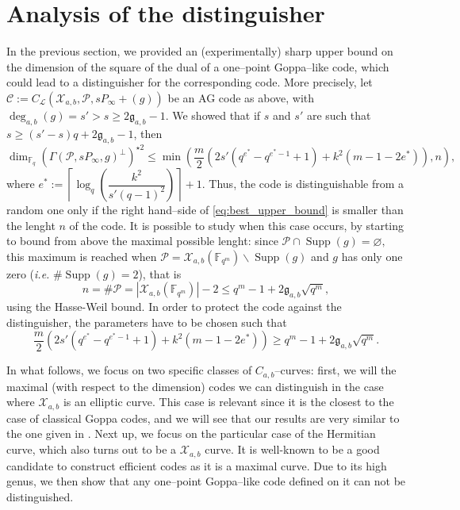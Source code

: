 \documentclass[a4paper]{amsart}
\theoremstyle{definition}
\theoremstyle{remark}
\newcommand{\calP}{\mathcal{P}}
\newcommand{\calL}{\mathcal{L}}
\newcommand{\calC}{\mathcal{C}}
\newcommand{\calX}{\mathcal{X}}
\newcommand{\fqm}{\mathbb{F}_{q^m}}
\newcommand{\fq}{\mathbb{F}_{q}}
\newcommand{\Supp}{\operatorname{Supp}}
\newcommand{\degab}[1]{\deg_{a,b}\left(#1\right)}
\begin{document}
\section{Analysis of the distinguisher}\label{sec:analysis}

In the previous section, we provided an (experimentally) sharp upper bound on the dimension of the square of the dual of a one--point Goppa--like code, which could lead to a distinguisher for the corresponding code. More precisely, let $\calC := C_\calL(\calX_{a,b},\calP,sP_\infty +(g))$ be an AG code as above, with $\degab{g} = s'>s\geq 2\mathfrak{g}_{a,b}-1$. We showed that if $s$ and $s'$ are such that $s \geq (s'-s)q+2\mathfrak{g}_{a,b}-1$, then
\begin{equation} \label{eq:best_upper_bound}
\dim_{\fq} (\Gamma(\calP,sP_\infty,g)^{\perp})^{\star 2} \leq \min \left(\frac{m}{2}\left(2s'(q^{e^*}-q^{e^*-1}+1)+k^2(m-1-2e^*)  \right),n\right),
\end{equation}
where $e^* := \left\lceil \log_q\left(\dfrac{k^2}{s'(q-1)^2}\right)\right\rceil+1$. Thus, the code is distinguishable from a random one only if the right hand--side of \eqref{eq:best_upper_bound} is smaller than the lenght $n$ of the code. It is possible to study when this case occurs, by starting to bound from above the maximal possible lenght: since $\calP \cap \Supp(g) = \varnothing,$ this maximum is reached when $\calP = \calX_{a,b}(\fqm) \backslash \Supp(g)$ and $g$ has only one zero (\emph{i.e.} $\#\Supp(g)=2$), that is
$$n = \# \calP = |\calX_{a,b}(\fqm)|-2 \leq q^m-1+2\mathfrak{g}_{a,b}\sqrt{q^m},$$
using the Hasse-Weil bound. In order to protect the code against the distinguisher, the parameters have to be chosen such that 
\begin{equation} \label{eq:cond_not_to_distinguish}
\frac{m}{2}\left(2s'(q^{e^*}-q^{e^*-1}+1)+k^2(m-1-2e^*)  \right)\geq q^m-1+2\mathfrak{g}_{a,b}\sqrt{q^m}.
\end{equation}

In what follows, we focus on two specific classes of $C_{a,b}$--curves: first, we will the maximal (with respect to the dimension) codes we can distinguish in the case where $\calX_{a,b}$ is an elliptic curve. This case is relevant since it is the closest to the case of classical Goppa codes, and we will see that our results are very similar to the one given in \cite{MT21}. Next up, we focus on the particular case of the Hermitian curve, which also turns out to be a $\calX_{a,b}$ curve. It is well-known to be a good candidate to construct efficient codes as it is a maximal curve. Due to its high genus, we then show that any one--point Goppa--like code defined on it can not be distinguished.
\end{document}
